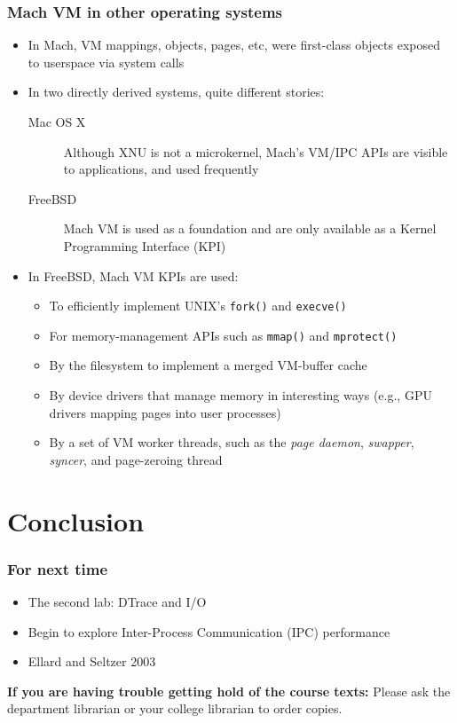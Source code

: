 \begin{frame}
  \frametitle{Mach VM in other operating systems}

  \begin{itemize}
    \item In Mach, VM mappings, objects, pages, etc, were first-class objects
      exposed to userspace via system calls

    \medskip
    \pause

    \item In two directly derived systems, quite different stories:
    \begin{description}
      \item[Mac OS X] Although XNU is not a microkernel, Mach's VM/IPC APIs
	are visible to applications, and used frequently
      \item[FreeBSD] Mach VM is used as a foundation and are only available as
	a Kernel Programming Interface (KPI)
    \end{description}

    \medskip
    \pause

    \item In FreeBSD, Mach VM KPIs are used:
    \begin{itemize}
      \item To efficiently implement UNIX's \texttt{fork()} and
	\texttt{execve()}
      \item For memory-management APIs such as \texttt{mmap()} and
	\texttt{mprotect()}
      \item By the filesystem to implement a merged VM-buffer cache
      \item By device drivers that manage memory in interesting ways (e.g.,
	GPU drivers mapping pages into user processes)
      \item By a set of VM worker threads, such as the \textit{page daemon},
	\textit{swapper}, \textit{syncer}, and page-zeroing thread
    \end{itemize}
  \end{itemize}
\end{frame}

\section{Conclusion}

\begin{frame}
  \frametitle{For next time}

  \begin{itemize}
    \item The second lab: DTrace and I/O
    \item Begin to explore Inter-Process Communication (IPC) performance

    \bigskip

    \item Ellard and Seltzer 2003
  \end{itemize}

  \bigskip

  \textbf{If you are having trouble getting hold of the course texts:} Please
    ask the department librarian or your college librarian to order copies.

\end{frame}



